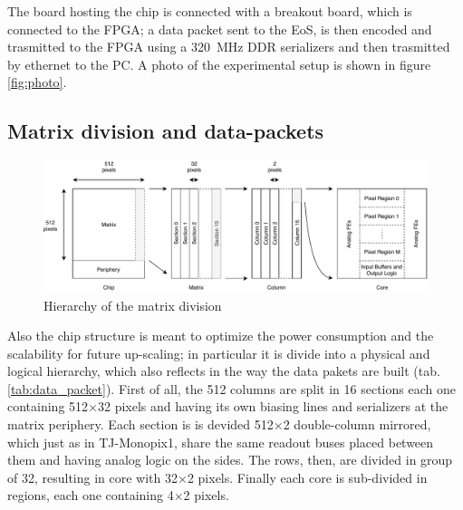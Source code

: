     The board hosting the chip is connected with a breakout board, which is connected to the FPGA; a data packet sent to the EoS, is then encoded and trasmitted to the FPGA using a \SI{320}{MHz} DDR serializers and then trasmitted by ethernet to the PC.
    A photo of the experimental setup is shown in figure \ref{fig:photo}.

    \subsection{Matrix division and data-packets}
        \begin{figure}[h!]
            \centering
            \includegraphics[width=.98\linewidth]{figures/ARCADIA/hierarchy.pdf}
            \caption{Hierarchy of the matrix division}
            \label{fig:hierarchy}
        \end{figure}
        Also the chip structure is meant to optimize the power consumption and the scalability for future up-scaling; in particular it is divide into a physical and logical hierarchy, which also reflects in the way the data pakets are built (tab.\ref{tab:data_packet}).
        First of all, the 512 columns are split in 16 sections each one containing 512$\times$32 pixels and having its own biasing lines and serializers at the matrix periphery. 
        Each section is is devided 512$\times$2 double-column mirrored, which just as in TJ-Monopix1, share the same readout buses placed between them and having analog logic on the sides.        
        The rows, then, are divided in group of 32, resulting in core with 32$\times$2 pixels. Finally each core is sub-divided in regions, each one containing 4$\times$2 pixels. 
